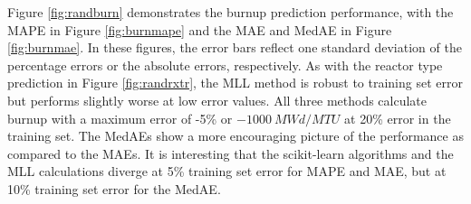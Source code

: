 Figure \ref{fig:randburn} demonstrates the burnup prediction performance, with
the \gls{MAPE} in Figure \ref{fig:burnmape} and the \gls{MAE} and \gls{MedAE}
in Figure \ref{fig:burnmae}. In these figures, the error bars reflect one
standard deviation of the percentage errors or the absolute errors,
respectively.  As with the reactor type prediction in Figure
\ref{fig:randrxtr}, the \gls{MLL} method is robust to training set error but
performs slightly worse at low error values.  All three methods calculate
burnup with a maximum error of -5\% or $-1000\:MWd/MTU$ at 20\% error in the
training set. The \gls{MedAE}s show a more encouraging picture of the
performance as compared to the \gls{MAE}s. It is interesting that the
scikit-learn algorithms and the \gls{MLL} calculations diverge at 5\% training
set error for \gls{MAPE} and \gls{MAE}, but at 10\% training set error for the
\gls{MedAE}.


